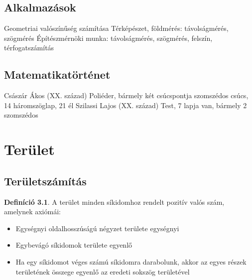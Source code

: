 \documentclass[twoside,12pt]{report}
\theoremstyle{definition}
\newtheorem{definition}[theorem]{Definíció}
\begin{document}
\section{Alkalmazások}
	\begin{outline}
		\1 Geometriai valószínűség számítása
		\1 Térképészet, földmérés: távolságmérés, szögmérés
		\1 Építészmérnöki munka: távolságmérés, szögmérés, felszín, térfogatszámítás
	\end{outline}
\section{Matematikatörténet}
	\begin{outline}
		\1 Császár Ákos (XX. század)
			\2 Poliéder, bármely két csúcspontja szomszédos
				 csúcs, 14 háromszöglap, 21 él
		\1 Szilassi Lajos (XX. század)
			\2 Test, 7 lapja van, bármely 2 szomszédos
	\end{outline}
\chapter{Terület}
\section{Területszámítás}
	\begin{definition}
		A terület minden síkidomhoz rendelt pozitív valós szám, amelynek axiómái:
		\begin{itemize}
			\item Egységnyi oldalhosszúságú négyzet területe egységnyi
			\item Egybevágó síkidomok területe egyenlő
			\item Ha egy síkidomot véges számú síkidomra darabolunk, akkor az egyes részek területének összege egyenlő az eredeti sokszög területével
		\end{itemize}
	\end{definition}
\end{document}
